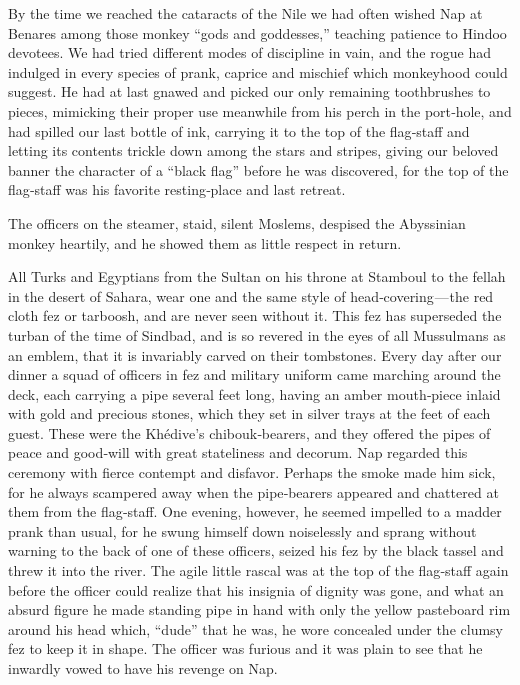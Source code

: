 \documentclass[12pt]{book}
\begin{document}
By the time we reached the cataracts of the Nile we had often wished Nap at
Benares among those monkey “gods and goddesses,” teaching patience to Hindoo
devotees. We had tried different modes of discipline in vain, and the rogue had
indulged in every species of prank, caprice and mischief which monkeyhood could
suggest. He had at last gnawed and picked our only remaining toothbrushes to
pieces, mimicking their proper use meanwhile from his perch in the port‐hole,
and had spilled our last bottle of ink, carrying it to the top of the flag‐staff and
letting its contents trickle down among the stars and stripes, giving our beloved
banner the character of a “black flag” before he was discovered, for the top of the
flag‐staff was his favorite resting‐place and last retreat.

The officers on the steamer, staid, silent Moslems, despised the Abyssinian
monkey heartily, and he showed them as little respect in return.

All Turks and Egyptians from the Sultan on his throne at Stamboul to the
fellah in the desert of Sahara, wear one and the same style of head‐covering — the
red cloth fez or tarboosh, and are never seen without it. This fez has superseded
the turban of the time of Sindbad, and is so revered in the eyes of all Mussulmans
as an emblem, that it is invariably carved on their tombstones. Every day after
our dinner a squad of officers in fez and military uniform came marching around
the deck, each carrying a pipe several feet long, having an amber mouth‐piece
inlaid with gold and precious stones, which they set in silver trays at the feet of
each guest. These were the Khédive’s chibouk‐bearers, and they offered the pipes
of peace and good‐will with great stateliness and decorum. Nap regarded this
ceremony with fierce contempt and disfavor. Perhaps the smoke made him sick,
for he always scampered away when the pipe‐bearers appeared and chattered at
them from the flag‐staff. One evening, however, he seemed impelled to a madder
prank than usual, for he swung himself down noiselessly and sprang without
warning to the back of one of these officers, seized his fez by the black tassel and
threw it into the river. The agile little rascal was at the top of the flag‐staff again
before the officer could realize that his insignia of dignity was gone, and what an
absurd figure he made standing pipe in hand with only the yellow pasteboard rim
around his head which, “dude” that he was, he wore concealed under the clumsy
fez to keep it in shape. The officer was furious and it was plain to see that he
inwardly vowed to have his revenge on Nap.
\end{document}

